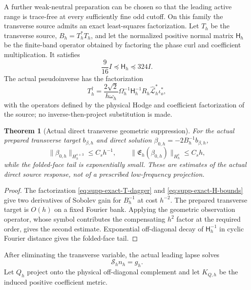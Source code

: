 \documentclass[11pt]{article}
\newtheorem{theorem}{Theorem}[section]
\theoremstyle{definition}
\theoremstyle{remark}
\begin{document}
A further weak-neutral preparation can be chosen so that the leading active
range is trace-free at every sufficiently fine odd cutoff.  On this family
the transverse source admits an exact least-squares factorization.  Let
$T_h$ be the transverse source, $B_h=T_h^*T_h$, and let the normalized
positive normal matrix $\mathsf H_h$ be the finite-band operator obtained by
factoring the phase curl and coefficient multiplication.  It satisfies
\begin{equation}
 \frac9{16}I\preceq\mathsf H_h\preceq324I.
 \label{eq:supp-exact-H-bounds}
\end{equation}
The actual pseudoinverse has the factorization
\begin{equation}
 T_h^\dagger=\frac{2\sqrt2}{h\omega_h}
 \Omega_h^{-1}\mathsf H_h^{-1}R_h\widehat{\mathcal L}_h^*\iota_o^*,
 \label{eq:supp-exact-T-dagger}
\end{equation}
with the operators defined by the physical Hodge and coefficient
factorization of the source; no inverse-then-project substitution is made.

\begin{theorem}[Actual direct transverse geometric suppression]
\label{thm:supp-exact-direct-transverse}
For the actual prepared transverse target $b_{\beta,h}$ and direct solution
$\beta_{0,h}=-2B_h^{-1}b_{\beta,h}$,
\begin{equation}
 \boxed{\|\beta_{0,h}\|_{H_h^{s+3}}\le C_sh^{-1},
 \qquad \|\mathfrak E_h(\beta_{0,h})\|_{H_h^s}\le C_sh,}
 \label{eq:supp-exact-direct-result}
\end{equation}
while the folded-face tail is exponentially small.  These are estimates of
the actual direct source response, not of a prescribed low-frequency
projection.
\end{theorem}
\begin{proof}
The factorization \eqref{eq:supp-exact-T-dagger} and
\eqref{eq:supp-exact-H-bounds} give two derivatives of Sobolev gain for
$B_h^{-1}$ at cost $h^{-2}$.  The prepared transverse target is $O(h)$ on a
fixed Fourier bank.  Applying the geometric observation operator, whose
symbol contributes the compensating $h^2$ factor at the required order,
gives the second estimate.  Exponential off-diagonal decay of
$\mathsf H_h^{-1}$ in cyclic Fourier distance gives the folded-face tail.
\end{proof}

After eliminating the transverse variable, the actual leading lapse solves
\begin{equation}
 \mathscr S_hn_h=g_h.
 \label{eq:supp-exact-scalar-equation}
\end{equation}
Let $Q_h$ project onto the physical off-diagonal complement and let
$K_{Q,h}$ be the induced positive coefficient metric.
\end{document}
